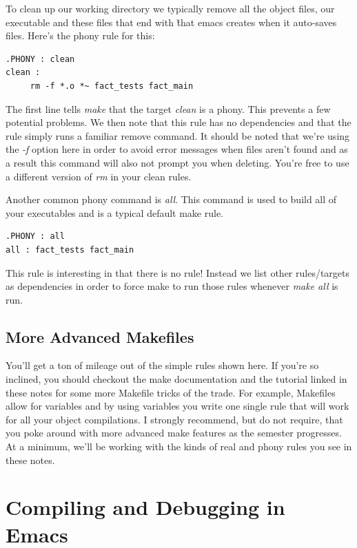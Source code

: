 \documentclass[]{tufte-handout}
\begin{document}
To clean up our working directory we typically remove all the object files, our executable and these files that end with \~ that emacs creates when it auto-saves files. Here's the phony rule for this:
\begin{verbatim}
.PHONY : clean
clean : 
     rm -f *.o *~ fact_tests fact_main 
\end{verbatim}
The first line tells \textit{make} that the target \textit{clean} is a phony. This prevents a few potential problems.  We then note that this rule has no dependencies and that the rule simply runs a familiar remove command. It should be noted that we're using the \textit{-f} option here in order to avoid error messages when files aren't found and as a result this command will also not prompt you when deleting. You're free to use a different version of \textit{rm} in your clean rules. 

Another common phony command is \textit{all}. This command is used to build all of your executables and is a typical default make rule.
\begin{verbatim}
.PHONY : all
all : fact_tests fact_main
\end{verbatim}
This rule is interesting in that there is no rule! Instead we list other rules/targets as dependencies in order to force make to run those rules whenever \textit{make all} is run. 

\subsection{More Advanced Makefiles}

You'll get a ton of mileage out of the simple rules shown here. If you're so inclined, you should checkout the make documentation and the tutorial linked in these notes for some more Makefile tricks of the trade. For example, Makefiles allow for variables and by using variables you write one single rule that will work for all your object compilations.  I strongly recommend, but do not require, that you poke around with more advanced make features as the semester progresses. At a minimum, we'll be working with the kinds of real and phony rules you see in these notes. 

\section{Compiling and Debugging in Emacs}
\end{document}
